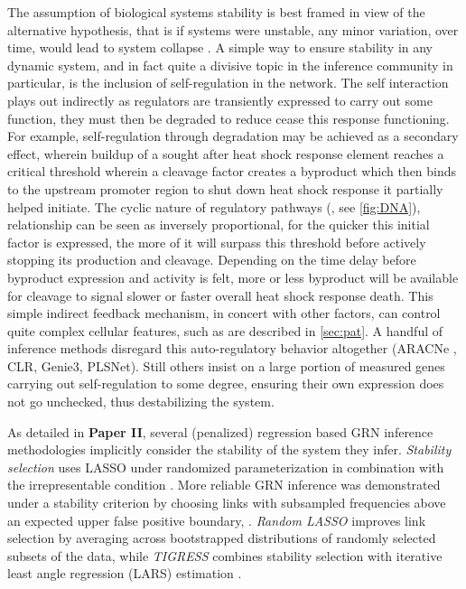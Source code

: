 The assumption of biological systems stability is best framed in view of the alternative hypothesis, that is if systems were unstable, any minor variation, over time, would lead to system collapse \citep{khalil1996adaptive}. A simple way to ensure stability in any dynamic system, and in fact quite a divisive topic in the inference community in particular, is the inclusion of self-regulation in the network. The self interaction plays out indirectly as regulators are transiently expressed to carry out some function, they must then be degraded to reduce cease this response functioning. For example, self-regulation through degradation may be achieved as a secondary effect, wherein buildup of a sought after heat shock response element reaches a critical threshold wherein a cleavage factor creates a byproduct which then binds to the upstream promoter region to shut down heat shock response it partially helped initiate. The cyclic nature of regulatory pathways (\citep{yi2000robust}, see \cref{fig:DNA}), relationship can be seen as inversely proportional, for the quicker this initial factor is expressed, the more of it will surpass this threshold before actively stopping its production and cleavage. Depending on the time delay before byproduct expression and activity is felt, more or less byproduct will be available for cleavage to signal slower or faster overall heat shock response death. This simple indirect feedback mechanism, in concert with other factors, can control quite complex cellular features, such as are described in \cref{sec:pat}. A handful of inference methods disregard this auto-regulatory behavior altogether (ARACNe \citep{montes2014aracne}, CLR\citep{faith2007large}, Genie3\citep{GENIE3}, PLSNet\citep{ham1996partial}). Still others insist on a large portion of measured genes carrying out self-regulation to some degree, ensuring their own expression does not go unchecked, thus destabilizing the system.

As detailed in \textbf{Paper II}, several (penalized) regression based GRN inference methodologies implicitly consider the stability of the system they infer. \textit{Stability selection} uses LASSO under randomized parameterization \citep{tibshirani1996regression} in combination with the irrepresentable condition \citep{zhao2006model,jia2012preconditioning}. More reliable GRN inference was demonstrated under a stability criterion by choosing links with subsampled frequencies above an expected upper false positive boundary,  \citep{meinshausen2010stability}.  \textit{Random LASSO} \citep{wang2011random} improves link selection by averaging across bootstrapped distributions of randomly selected subsets of the data, while \textit{TIGRESS} combines stability selection with iterative least angle regression (LARS) estimation \citep{haury2012tigress}.

